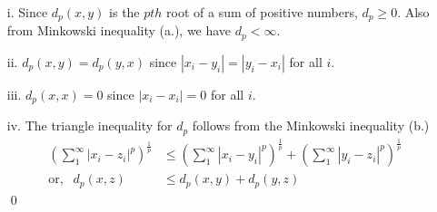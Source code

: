 
\begin{solution}
    \begin{enumerate}
        \item[i.]
              Since $d_p(x,y)$ is the $pth$ root of a sum of positive
              numbers, $d_p\geq 0$. Also from Minkowski inequality (a.),
              we have $d_p<\infty$.
              
        \item[ii.]
              $d_p(x,y)=d_p(y,x)$ since $|x_i-y_i| = |y_i-x_i|$
              for all $i$.
        \item[iii.] 
              $d_p(x,x)=0$ since $|x_i-x_i|=0$ for all $i$.
        \item[iv.]
              The triangle inequality for $d_p$ follows from the Minkowski
              inequality (b.)
              \begin{align*}
                \left(\sum_{1}^{\infty}{|x_{i} - z_{i}|^p}\right)^
              \frac{1}{p}&\leq
              \left(\sum_{1}^{\infty}{|x_{i}-y_i|^{p}}\right)^{\frac{1}{p}}
              +
              \left(\sum_{1}^{\infty}{|y_{i}-z_i|^{p}}\right)^{\frac{1}{p}}\\
              \text{or, }\ \ d_p(x,z)&\leq d_p(x,y)+d_p(y,z)
              \end{align*}\qed
    \end{enumerate}
    
\end{solution}